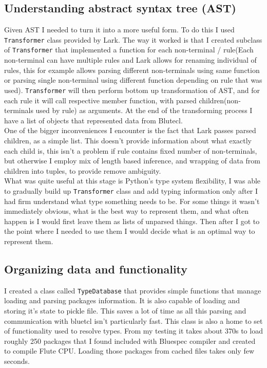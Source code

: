 \documentclass[12pt]{report}
\begin{document}
\subsection{Understanding abstract syntax tree (AST)}
Given AST I needed to turn it into a more useful form. To do this I used \verb!Transformer! class provided by Lark. The way it worked is that I created subclass of \verb!Transformer! that implemented a function for each non-terminal / rule(Each non-terminal can have multiple rules and Lark allows for renaming individual of rules, this for example allows parsing different non-terminals using same function or parsing single non-terminal using different function depending on rule that was used). \verb!Transformer! will then perform bottom up transformation of AST, and for each rule it will call respective member function, with parsed children(non-terminals used by rule) as arguments. At the end of the transforming process I have a list of objects that represented data from Blutecl.
\\
One of the bigger inconveniences I encounter is the fact that Lark passes parsed children, as a simple list. This doesn't provide information about what exactly each child is, this isn't a problem if rule contains fixed number of non-terminals, but otherwise I employ mix of length based inference, and wrapping of data from children into tuples, to provide remove ambiguity.
\\
What was quite useful at this stage is Python's type system flexibility, I was able to gradually build up \verb!Transformer! class and add typing information only after I had firm understand what type something needs to be. For some things it wasn't immediately obvious, what is the best way to represent them, and what often happen is I would first leave them as lists of unparsed things. Then after I got to the point where I needed to use them I would decide what is an optimal way to represent them.

\subsection{Organizing data and functionality}
I created a class called \verb!TypeDatabase! that provides simple functions that manage loading and parsing packages information. It is also capable of loading and storing it's state to pickle file. This saves a lot of time as all this parsing and communication with bluetcl isn't particularly fast. This class is also a home to set of functionality used to resolve types. From my testing it takes about 370s to load roughly 250 packages that I found included with Bluespec compiler and created to compile Flute CPU. Loading those packages from cached files takes only few seconds.
\end{document}
